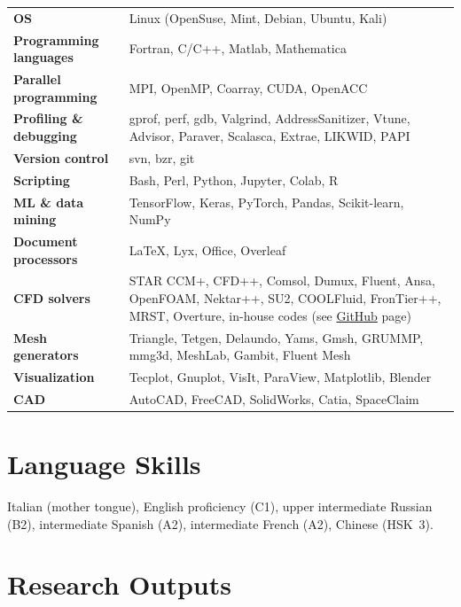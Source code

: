 \documentclass[11pt,a4paper]{article}
\begin{document}
\begin{tabular}{@{}>{\bfseries}p{5cm}p{11cm}@{}}
  OS                       & Linux (OpenSuse, Mint, Debian, Ubuntu, Kali)  \\[2pt]
  Programming languages    & Fortran, C/C++, Matlab, Mathematica \\[2pt]
  Parallel programming     & MPI, OpenMP, Coarray, CUDA, OpenACC \\[2pt]
  Profiling \& debugging   & gprof, perf, gdb, Valgrind, AddressSanitizer, Vtune, Advisor, Paraver,
                             Scalasca, Extrae, LIKWID, PAPI \\[2pt]
  Version control          & svn, bzr, git \\[2pt]
  Scripting                & Bash, Perl, Python, Jupyter, Colab, R \\[2pt]
  ML \& data mining        & TensorFlow, Keras, PyTorch, Pandas, Scikit-learn, NumPy \\[2pt]
  Document processors      & \LaTeX, Lyx, Office, Overleaf \\[2pt]
  CFD solvers              & STAR CCM+, CFD++, Comsol, Dumux, Fluent, Ansa, OpenFOAM,
                             Nektar++, SU2, COOLFluid, FronTier++, MRST, Overture, in-house codes (see \href{https://github.com/lkampoli}{GitHub} page) \\[2pt]
  Mesh generators          & Triangle, Tetgen, Delaundo, Yams, Gmsh, GRUMMP,
                             mmg3d, MeshLab, Gambit, Fluent Mesh\\[2pt]
  Visualization            & Tecplot, Gnuplot, VisIt, ParaView, Matplotlib, Blender \\[2pt]
  CAD                      & AutoCAD, FreeCAD, SolidWorks, Catia, SpaceClaim \\
\end{tabular}

\section{Language Skills}

Italian (mother tongue), English proficiency (C1), upper intermediate Russian (B2),
intermediate Spanish (A2), intermediate French (A2), Chinese (HSK~3).

\newpage

\section{Research Outputs}
\end{document}
